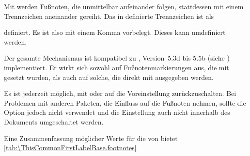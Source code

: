 Mit
 werden
Fußnoten, die unmittelbar aufeinander folgen, stattdessen mit einem
Trennzeichen aneinander gereiht. Das in
 definierte Trennzeichen ist
als
\begin{lstcode}
  \newcommand*{\multfootsep}{,}
\end{lstcode}
definiert. Es ist also mit einem Komma vorbelegt. Dieses kann umdefiniert
werden.

Der gesamte Mechanismus ist kompatibel zu
,
Version~5.3d bis 5.5b (siehe \cite{package:footmisc}) implementiert. Er wirkt
sich sowohl auf Fußnotenmarkierungen aus, die mit
 gesetzt wurden,
als auch auf solche, die direkt mit
ausgegeben werden.

Es ist jederzeit möglich, mit 
oder  auf die Voreinstellung
 zurückzuschalten. Bei Problemen mit
anderen Paketen, die Einfluss auf die Fußnoten nehmen, sollte die Option
jedoch nicht verwendet und die Einstellung auch nicht innerhalb des Dokuments
umgeschaltet werden.

Eine Zusammenfassung möglicher Werte für die  von
 bietet
\autoref{tab:\ThisCommonFirstLabelBase.footnotes}%
%
%
\EndIndexGroup


